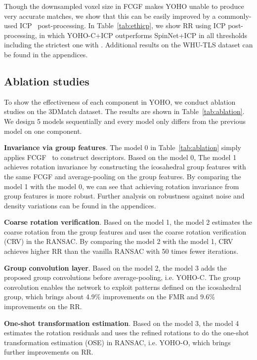 Though the downsampled voxel size in FCGF makes YOHO unable to produce very accurate matches, we show that this can be easily improved by a commonly-used ICP~\cite{icp} post-processing. In Table~\ref{tab:ethicp}, we show RR using ICP post-processing, in which YOHO-C+ICP outperforms SpinNet+ICP in all thresholds including the strictest one with . Additional results on the WHU-TLS dataset can be found in the appendices.


\subsection{Ablation studies}
\label{sec:ablation}
To show the effectiveness of each component in YOHO, we conduct ablation studies on the 3DMatch dataset. The results are shown in Table~\ref{tab:ablation}. We design 5 models sequentially and every model only differs from the previous model on one component. 


\textbf{Invariance via group features}. The model 0 in Table~\ref{tab:ablation} simply applies FCGF~\cite{FCGF} to construct descriptors. Based on the model 0, The model 1 achieves rotation invariance by constructing the icosahedral group features with the same FCGF and average-pooling on the group features. By comparing the model 1 with the model 0, we can see that achieving rotation invariance from group features is more robust. Further analysis on robustness against noise and density variations can be found in the appendices.

\textbf{Coarse rotation verification}. Based on the model 1, the model 2 estimates the coarse rotation from the group features  and uses the coarse rotation verification (CRV) in the RANSAC. By comparing the model 2 with the model 1, CRV achieves higher RR than the vanilla RANSAC with 50 times fewer iterations.

\textbf{Group convolution layer}. Based on the model 2, the model 3 adds the proposed group convolutions before average-pooling, i.e. YOHO-C. The group convolution enables the network to exploit patterns defined on the icosahedral group, which brings about 4.9\% improvements on the FMR and 9.6\% improvements on the RR.

\textbf{One-shot transformation estimation}. Based on the model 3, the model 4 estimates the rotation residuals and uses the refined rotations to do the one-shot transformation estimation (OSE) in RANSAC, i.e. YOHO-O, which brings further improvements on RR.



